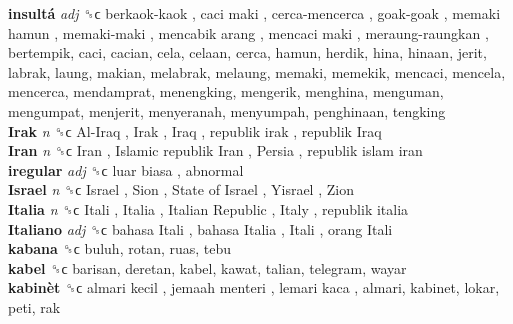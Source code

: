 \textbf{insultá} \emph{adj}  ␝ϲ   berkaok-kaok ,  caci maki ,  cerca-mencerca ,  goak-goak ,  memaki hamun ,  memaki-maki ,  mencabik arang ,  mencaci maki ,  meraung-raungkan , bertempik, caci, cacian, cela, celaan, cerca, hamun, herdik, hina, hinaan, jerit, labrak, laung, makian, melabrak, melaung, memaki, memekik, mencaci, mencela, mencerca, mendamprat, menengking, mengerik, menghina, menguman, mengumpat, menjerit, menyeranah, menyumpah, penghinaan, tengking  \\
\textbf{Irak} \emph{n}  ␝ϲ   Al-Iraq ,  Irak ,  Iraq ,  republik irak ,  republik Iraq   \\
\textbf{Iran} \emph{n}  ␝ϲ   Iran ,  Islamic republik Iran ,  Persia ,  republik islam iran   \\
\textbf{iregular} \emph{adj}  ␝ϲ   luar biasa , abnormal  \\
\textbf{Israel} \emph{n}  ␝ϲ   Israel ,  Sion ,  State of Israel ,  Yisrael ,  Zion   \\
\textbf{Italia} \emph{n}  ␝ϲ   Itali ,  Italia ,  Italian Republic ,  Italy ,  republik italia   \\
\textbf{Italiano} \emph{adj}  ␝ϲ   bahasa Itali ,  bahasa Italia ,  Itali ,  orang Itali   \\
\textbf{kabana} ␝ϲ  buluh, rotan, ruas, tebu  \\
\textbf{kabel} ␝ϲ  barisan, deretan, kabel, kawat, talian, telegram, wayar  \\
\textbf{kabinèt} ␝ϲ   almari kecil ,  jemaah menteri ,  lemari kaca , almari, kabinet, lokar, peti, rak  \\
